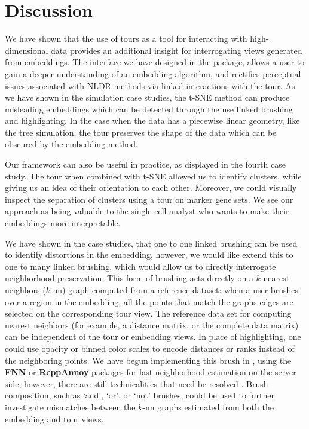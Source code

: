 \documentclass[article,notitle]{jdssv}
\begin{document}
\hypertarget{discussion}{%
\section{Discussion}\label{discussion}}

We have shown that the use of tours as a tool for interacting with
high-dimensional data provides an additional insight for interrogating views
generated from embeddings. The interface we have designed in the 
package, allows a user to gain a deeper understanding of an embedding
algorithm, and rectifies perceptual issues associated with NLDR methods via
linked interactions with the tour. As we have shown in the simulation case
studies, the t-SNE method can produce misleading embeddings which can be
detected through the use linked brushing and highlighting. In the case when
the data has a piecewise linear geometry, like the tree simulation, the tour
preserves the shape of the data which can be obscured by the embedding method.

Our framework can also be useful in practice, as displayed
in the fourth case study. The tour when combined with t-SNE allowed us
to identify clusters, while giving us an idea of their orientation to
each other. Moreover, we could visually inspect the separation of clusters
using a tour on marker gene sets. We see our approach as being valuable
to the single cell analyst who wants to make their embeddings more
interpretable.

We have shown in the case studies, that one to one linked brushing can
be used to identify distortions in the embedding, however, we would
like extend this to one to many linked brushing, which would allow us to directly interrogate neighborhood preservation. This form of brushing acts directly on a \(k\)-nearest neighbors (\(k\)-nn) graph computed from a
reference dataset: when a user brushes over a region in the embedding,
all the points that match the graphs edges are selected on the
corresponding tour view. The reference data set for computing
nearest neighbors (for example, a distance matrix, or the complete data matrix)
can be independent of the tour or embedding views. In place of
highlighting, one could use opacity or binned color scales to encode
distances or ranks instead of the neighboring points. We have begun
implementing this brush in , using the \textbf{FNN} or \textbf{RcppAnnoy}
packages for fast neighborhood estimation on the server side, however, there
are still technicalities that need be resolved \citep{fnn-pkg, rcpp-annoy-pkg}.
Brush composition, such as `and', `or', or `not' brushes, could be used to
further investigate mismatches between the \(k\)-nn graphs estimated from both the embedding and tour views.
\end{document}
